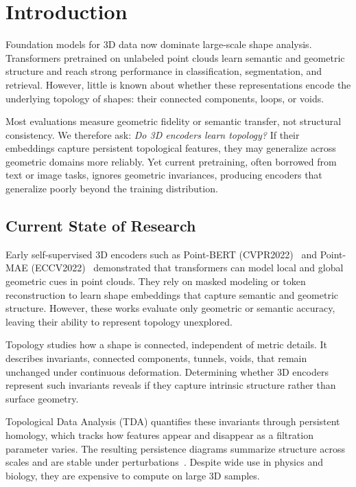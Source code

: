 \section{Introduction}
\label{sec:intro}


Foundation models for 3D data now dominate large-scale shape analysis. Transformers pretrained on unlabeled point clouds learn semantic and geometric structure and reach strong performance in classification, segmentation, and retrieval. However, little is known about whether these representations encode the underlying topology of shapes: their connected components, loops, or voids.

Most evaluations measure geometric fidelity or semantic transfer, not structural consistency. We therefore ask: \textit{Do 3D encoders learn topology?} If their embeddings capture persistent topological features, they may generalize across geometric domains more reliably. Yet current pretraining, often borrowed from text or image tasks, ignores geometric invariances, producing encoders that generalize poorly beyond the training distribution.

\subsection{Current State of Research}

Early self-supervised 3D encoders such as Point-BERT (CVPR2022)~\cite{pbert}  and Point-MAE (ECCV2022)~\cite{pmae} demonstrated that transformers can model local and global geometric cues in point clouds. They rely on masked modeling or token reconstruction to learn shape embeddings that capture semantic and geometric structure. However, these works evaluate only geometric or semantic accuracy, leaving their ability to represent topology unexplored.

Topology studies how a shape is connected, independent of metric details. It describes invariants, connected components, tunnels, voids, that remain unchanged under continuous deformation. Determining whether 3D encoders represent such invariants reveals if they capture intrinsic structure rather than surface geometry.

Topological Data Analysis (TDA) quantifies these invariants through persistent homology, which tracks how features appear and disappear as a filtration parameter varies. The resulting persistence diagrams summarize structure across scales and are stable under perturbations~\cite{cohen2007stability}. Despite wide use in physics and biology, they are expensive to compute on large 3D samples.

